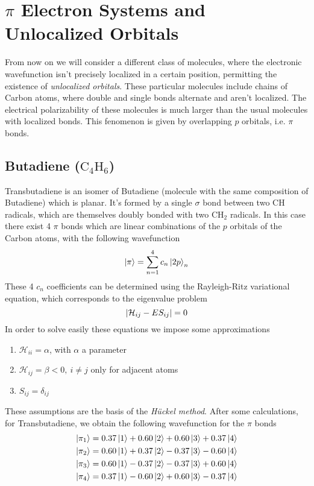 \documentclass[../qm.tex]{subfiles}
\begin{document}
	\section{$\pi$ Electron Systems and Unlocalized Orbitals}
	From now on we will consider a different class of molecules, where the electronic wavefunction isn't precisely localized in a certain position, permitting the existence of \textit{unlocalized orbitals}. These particular molecules include chains of Carbon atoms, where double and single bonds alternate and aren't localized. The electrical polarizability of these molecules is much larger than the usual molecules with localized bonds. This fenomenon is given by overlapping $p$ orbitals, i.e. $\pi$ bonds.
	\subsection{Butadiene ($\mathrm{C_4H_6}$)}
	Transbutadiene is an isomer of Butadiene (molecule with the same composition of Butadiene) which is planar. It's formed by a single $\sigma$ bond between two $\mathrm{CH}$ radicals, which are themselves doubly bonded with two $\mathrm{CH_2}$ radicals. In this case there exist 4 $\pi$ bonds which are linear combinations of the $p$ orbitals of the Carbon atoms, with the following wavefunction
	\begin{equation}
		\ket{\pi}=\sum_{n=1}^4c_n\ket{2p}_n
		\label{eq:nonlocalizedbutadiene}
	\end{equation}
	These 4 $c_n$ coefficients can be determined using the Rayleigh-Ritz variational equation, which corresponds to the eigenvalue problem
	\begin{equation*}
		\abs{\mathcal{H}_{ij}-ES_{ij}}=0
	\end{equation*}
	In order to solve easily these equations we impose some approximations
	\begin{enumerate}
	\item $\mathcal{H}_{ii}=\alpha$, with $\alpha$ a parameter
	\item $\mathcal{H}_{ij}=\beta<0,\ i\ne j$ only for adjacent atoms
	\item $S_{ij}=\delta_{ij}$
	\end{enumerate}
	These assumptions are the basis of the \textit{Hückel method}. After some calculations, for Transbutadiene, we obtain the following wavefunction for the $\pi$ bonds
	\begin{equation}
		\begin{aligned}
			\ket{\pi_1}&=0.37\ket{1}+0.60\ket{2}+0.60\ket{3}+0.37\ket{4}\\
			\ket{\pi_2}&=0.60\ket{1}+0.37\ket{2}-0.37\ket{3}-0.60\ket{4}\\
			\ket{\pi_3}&=0.60\ket{1}-0.37\ket{2}-0.37\ket{3}+0.60\ket{4}\\
			\ket{\pi_4}&=0.37\ket{1}-0.60\ket{2}+0.60\ket{3}-0.37\ket{4}
		\end{aligned}
		\label{eq:butadienewf}
	\end{equation}
\end{document}
